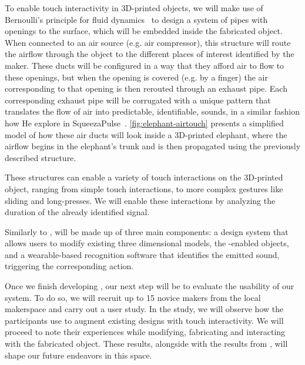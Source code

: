         To enable touch interactivity in 3D-printed objects, we will make use
        of Bernoulli's principle for fluid dynamics~\cite{Bernoulli:1738ut} to
        design a system of pipes with openings to the surface, which will be
        embedded inside the fabricated object. When connected to an air source
        (e.g. air compressor), this structure will route the airflow through
        the object to the different places of interest identified by the maker.
        These ducts will be configured in a way that they afford air to flow to
        these openings, but when the opening is covered (e.g. by a finger) the
        air corresponding to that opening is then rerouted through an exhaust
        pipe. Each corresponding exhaust pipe will be corrugated with a unique
        pattern that translates the flow of air into predictable, identifiable,
        sounds, in a similar fashion how He \etal explore in
        SqueezaPulse~\cite{He:2017jc}. \cref{fig:elephant-airtouch} presents a
        simplified model of how these air ducts will look inside a 3D-printed
        elephant, where the airflow begins in the elephant's trunk and is then
        propagated using the previously described structure.

        These structures can enable a variety of touch interactions on the
        3D-printed object, ranging from simple touch interactions, to more
        complex gestures like sliding and long-presses. We will enable these
        interactions by analyzing the duration of the already identified
        signal.

        Similarly to \bh, \at will be made up of three main components: a
        design system that allows users to modify existing three dimensional
        models, the \at-enabled objects, and a wearable-based recognition
        software that identifies the emitted sound, triggering the
        corresponding action.

        Once we finish developing \at, our next step will be to evaluate the
        usability of our system. To do so, we will recruit up to 15 novice
        makers from the local makerspace and carry out a user study. In the
        study, we will observe how the participants use \at to augment existing
        designs with touch interactivity. We will proceed to note their
        experiences while modifying, fabricating and interacting with the
        fabricated object. These results, alongside with the results from \bh,
        will shape our future endeavors in this space.

